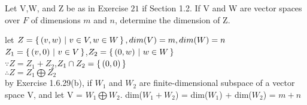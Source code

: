 Let V,W, and Z be as in Exercise $21$ if Section 1.2. If V and W are vector spaces over $F$ of dimensions $m$ and $n$, determine the dimension of Z.

\begin{tcolorbox}
	\begin{solution}
		let $Z = \left\{ \,(v,w) ~|~ v \in V,w \in W \,\right\}, dim(V)=m,dim(W)=n$\\
		$Z_1 = \left\{ \,(v,0) ~|~ v \in V \,\right\}$,$Z_2 = \left\{ \,(0,w) ~|~ w \in W \,\right\}$\\
		$\because Z = Z_1 + Z_2$,$Z_1 \cap Z_2 = \left\{ \,(0,0) \,\right\}$\\
		$\therefore Z = Z_1 \bigoplus Z_2$\\
		by Exercise 1.6.29(b), if $W_1$ and $W_2$ are finite-dimensional subspace of a vector space V, and let V = $W_1 \bigoplus W_2$. dim($W_1+W_2$) = dim($W_1$) + dim($W_2$) = $m+n$
			
	\end{solution}
\end{tcolorbox}